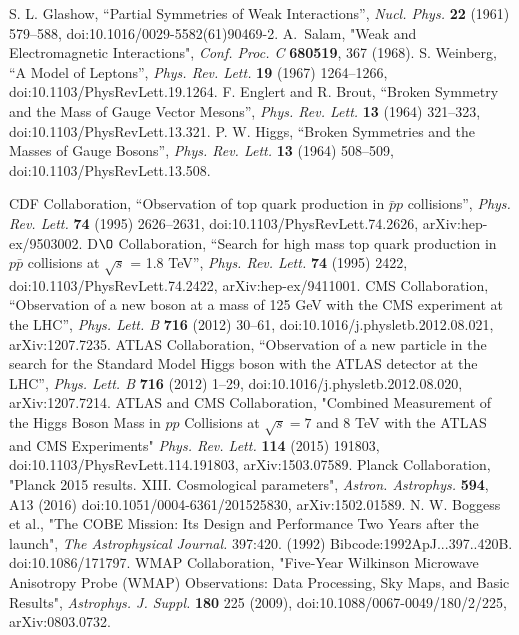
\begin{thebibliography}{9}

 S. L. Glashow, “Partial Symmetries of Weak Interactions”, {\it Nucl. Phys.} \textbf{22} (1961) 579–588, 
  doi:10.1016/0029-5582(61)90469-2.
  A.~Salam, "Weak and Electromagnetic Interactions",
  {\it Conf. Proc. C} {\bf 680519}, 367 (1968).
   S. Weinberg, “A Model of Leptons”, {\it Phys. Rev. Lett.} {\bf 19} (1967) 1264–1266, 
   doi:10.1103/PhysRevLett.19.1264.
F. Englert and R. Brout, 
“Broken Symmetry and the Mass of Gauge Vector Mesons”, 
{\it Phys. Rev. Lett.} {\bf 13} (1964) 321–323, doi:10.1103/PhysRevLett.13.321.
 P. W. Higgs, “Broken Symmetries and the Masses of Gauge Bosons”, 
  {\it Phys. Rev. Lett.} {\bf 13} (1964) 508–509, doi:10.1103/PhysRevLett.13.508.

CDF Collaboration, “Observation of top quark production in $\bar{p}p$ collisions”, 
{\it Phys. Rev. Lett.} {\bf 74} (1995) 2626–2631, doi:10.1103/PhysRevLett.74.2626, arXiv:hep-ex/9503002.
 D$\O$ Collaboration, “Search for high mass top quark production in $p\bar{p}$ collisions at $\sqrt{s}$ = 1.8 TeV”, 
 {\it Phys. Rev. Lett.} {\bf 74} (1995) 2422, 
 doi:10.1103/PhysRevLett.74.2422, arXiv:hep-ex/9411001.
 CMS Collaboration, “Observation of a new boson at a mass of 125 GeV with the CMS experiment at the LHC”, {\it Phys. Lett. B} {\bf 716} (2012) 30–61, 
 doi:10.1016/j.physletb.2012.08.021, arXiv:1207.7235.
 ATLAS Collaboration, “Observation of a new particle in the search for the Standard Model Higgs boson with the ATLAS detector at the LHC”, {\it Phys. Lett. B} {\bf 716} (2012) 1–29, doi:10.1016/j.physletb.2012.08.020, arXiv:1207.7214.
ATLAS and CMS Collaboration, "Combined Measurement of the Higgs Boson Mass in $pp$ Collisions at $\sqrt{s}=7$ and 8 TeV with the ATLAS and CMS Experiments"
{\it Phys. Rev. Lett.} {\bf 114} (2015) 191803, doi:10.1103/PhysRevLett.114.191803, arXiv:1503.07589.
  Planck Collaboration,
  "Planck 2015 results. XIII. Cosmological parameters",
  {\it Astron. Astrophys.} {\bf 594}, A13 (2016)
  doi:10.1051/0004-6361/201525830, arXiv:1502.01589.
  N. W. Boggess et al., "The COBE Mission: Its Design and Performance Two Years after the launch", {\it The Astrophysical Journal.} 397:420. (1992)
  Bibcode:1992ApJ...397..420B.
  doi:10.1086/171797.
  WMAP Collaboration, "Five-Year Wilkinson Microwave Anisotropy Probe (WMAP) Observations: Data Processing, Sky Maps, and Basic Results",
  {\it Astrophys. J. Suppl.} {\bf 180} 225 (2009),
  doi:10.1088/0067-0049/180/2/225, arXiv:0803.0732.
  

\end{thebibliography}
